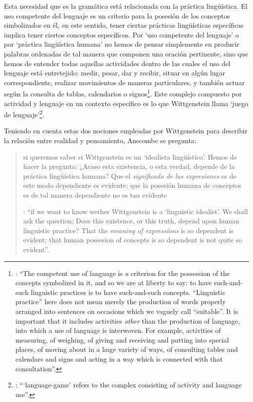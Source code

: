 Esta necesidad que es la gramática está relacionada con la práctica lingüística. El uso competente del lenguaje es un criterio para la posesión de los conceptos simbolizados en él, en este sentido, tener ciertas prácticas lingüísticas específicas implica tener ciertos conceptos específicos. Por `uso competente del lenguaje' o por `práctica lingüística humana' no hemos de pensar simplemente en producir palabras ordenadas de tal manera que componen una oración pertinente, sino que hemos de entender todas aquellas actividades dentro de las cuales el uso del lenguaje está entretejido: medir, pesar, dar y recibir, situar en algún lugar correspondiente, realizar movimientos de maneras particulares, y también actuar según la consulta de tablas, calendarios o signos\footnote{\cite[Cf.][117]{anscombe1981parmenides:qli}: \enquote{The competent use of language is \emph{a} criterion for the possession of the concepts symbolized in it, and so we are at liberty to say: to have such-and-such linguistic practices is to have such-and-such concepts. ``Linguistic practice'' here does not mean merely the production of words properly arranged into sentences on occasions which we vaguely call ``suitable''. It is important that it includes activities \emph{other} than the production of language, into which a use of language is interwoven. For example, activities of measuring, of weighing, of giving and receiving and putting into special places, of moving about in a huge variety of ways, of consulting tables and calendars and signs and acting in a way which is connected with that consultation}.}. Este complejo compuesto por actividad y lenguaje en un contexto específico es lo que Wittgenstein llama `juego de lenguaje'\footnote{\cite[Cf.][62]{bakerhacker2009understanding}: \enquote{`language-game' refers to the complex consisting of activity and language use}.}.

Teniendo en cuenta estas dos nociones empleadas por Wittgenstein para describir la relación entre realidad y pensamiento, Anscombe se pregunta:
\blockquote[{\Cite[116]{anscombe1981parmenides:qli}}: \enquote{if we want to know wether Wittgenstein is a `linguistic idealist'. We shall ask the question: Does this existence, or this truth, depend upon human linguistic practice? That the \emph{meaning of expressions} is so dependent is evident; that human possesion of concepts is so dependent is not quite so evident}.]{si queremos saber si Wittgenstein es un `idealista lingüístico'. Hemos de hacer la pregunta: ¿Acaso esta existencia, o esta verdad, depende de la práctica lingüística humana? Que el \emph{significado de las expresiones} es de este modo dependiente es evidente; que la posesión humana de conceptos es de tal manera dependiente no es tan evidente}.

